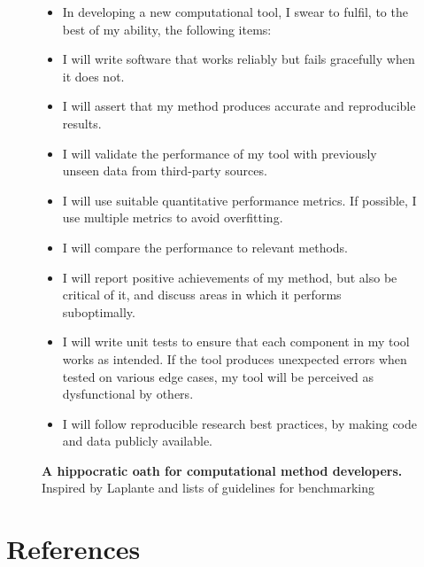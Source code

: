 \begin{figure}[htb!]
	\centering
	\begin{tcolorbox}
		\begin{itemize}
			\item In developing a new computational tool, I swear to fulfil, to the best of my ability, the following items:
			\item I will write software that works reliably but fails gracefully when it does not.
			\item I will assert that my method produces accurate and reproducible results.
			\item I will validate the performance of my tool with previously unseen data from third-party sources.
			\item I will use suitable quantitative performance metrics. If possible, I use multiple metrics to avoid overfitting.
			\item I will compare the performance to relevant methods.
			\item I will report positive achievements of my method, but also be critical of it, and discuss areas in which it performs suboptimally.
			\item I will write unit tests to ensure that each component in my tool works as intended. If the tool produces unexpected errors when tested on various edge cases, my tool will be perceived as dysfunctional by others.
			\item I will follow reproducible research best practices, by making code and data publicly available.
		\end{itemize}
	\end{tcolorbox}
	\caption{
		\textbf{A hippocratic oath for computational method developers.} Inspired by Laplante\cite{laplante_firstnoharm_2004} and lists of guidelines for benchmarking\cite{norel_selfassessmenttrapcan_2011,weber_essentialguidelinescomputational_2019}
	}
	\label{fig:hippocratic_oath}
\end{figure}



\clearpage
\section{References}
\printbibliography[heading=none]